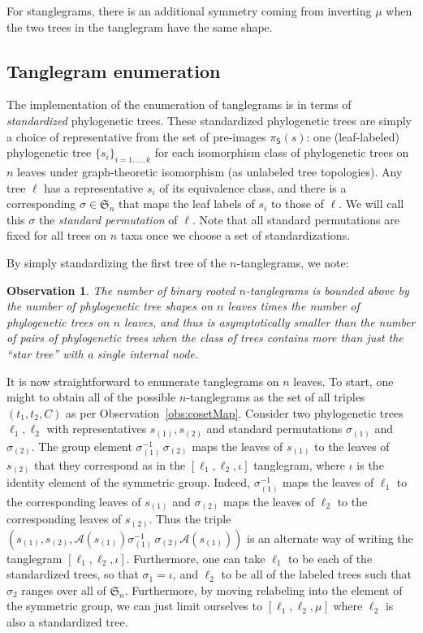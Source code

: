 \documentclass{amsart}
\newtheorem{observation}{Observation}
\newcommand{\fS}{\mathfrak S}
\newcommand{\aut}{\mathcal A}
\newcommand{\pairing}{\mu}
\newcommand{\shape}{\mathsf{S}}
\newcommand{\id}{\iota}
\begin{document}
For stanglegrams, there is an additional symmetry coming from inverting $\pairing$ when the two trees in the tanglegram have the same shape.


\subsection{Tanglegram enumeration}
The implementation of the enumeration of tanglegrams is in terms of \emph{standardized} phylogenetic trees.
These standardized phylogenetic trees are simply a choice of representative from the set of pre-images $\pi_\shape(s)$: one (leaf-labeled) phylogenetic tree $\{s_i\}_{i=1,\ldots,k}$ for each isomorphism class of phylogenetic trees on $n$ leaves under graph-theoretic isomorphism (as unlabeled tree topologies).
Any tree $\ell$ has a representative $s_i$ of its equivalence class, and there is a corresponding $\sigma \in \fS_n$ that maps the leaf labels of $s_i$ to those of $\ell$.
We will call this $\sigma$ the \emph{standard permutation} of $\ell$.
Note that all standard permutations are fixed for all trees on $n$ taxa once we choose a set of standardizations.

By simply standardizing the first tree of the $n$-tanglegrams, we note:
\begin{observation}
\label{obs:count}
The number of binary rooted $n$-tanglegrams is bounded above by the number of phylogenetic tree shapes on $n$ leaves times the number of phylogenetic trees on $n$ leaves, and thus is asymptotically smaller than the number of pairs of phylogenetic trees when the class of trees contains more than just the ``star tree'' with a single internal node.
\end{observation}

It is now straightforward to enumerate tanglegrams on $n$ leaves.
To start, one might to obtain all of the possible $n$-tanglegrams as the set of all triples $(t_1, t_2, C)$ as per Observation~\ref{obs:cosetMap}.
Consider two phylogenetic trees $\ell_1, \ell_2$ with representatives $s_{(1)}, s_{(2)}$ and standard permutations $\sigma_{(1)}$ and $\sigma_{(2)}$.
The group element $\sigma_{(1)}^{-1} \, \sigma_{(2)}$ maps the leaves of $s_{(1)}$ to the leaves of $s_{(2)}$ that they correspond as in the $[\ell_1, \ell_2, \id]$ tanglegram, where $\id$ is the identity element of the symmetric group.
Indeed, $\sigma_{(1)}^{-1}$ maps the leaves of $\ell_1$ to the corresponding leaves of $s_{(1)}$ and $\sigma_{(2)}$ maps the leaves of $\ell_2$ to the corresponding leaves of $s_{(2)}$.
Thus the triple $(s_{(1)}, s_{(2)}, \aut(s_{(1)}) \sigma_{(1)}^{-1} \, \sigma_{(2)} \aut(s_{(1)}))$ is an alternate way of writing the tanglegram $[\ell_1, \ell_2, \id]$.
Furthermore, one can take $\ell_1$ to be each of the standardized trees, so that $\sigma_1 = \id$, and $\ell_2$ to be all of the labeled trees such that $\sigma_2$ ranges over all of $\fS_n$.
Furthermore, by moving relabeling into the element of the symmetric group, we can just limit ourselves to $[\ell_1, \ell_2, \pairing]$ where $\ell_2$ is also a standardized tree.
\end{document}
